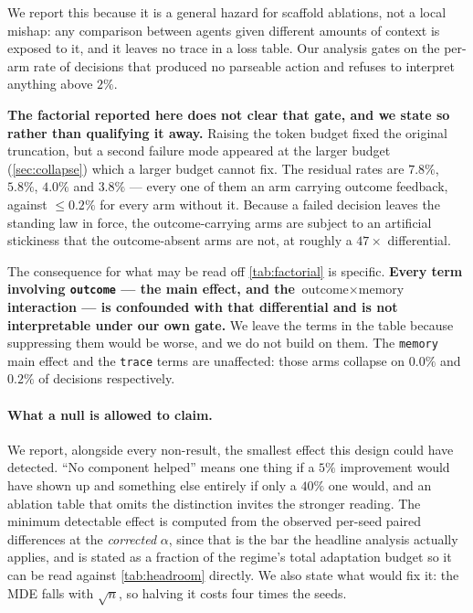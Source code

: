 \documentclass[11pt]{article}
\begin{document}
We report this because it is a general hazard for scaffold ablations, not a local mishap: any
comparison between agents given different amounts of context is exposed to it, and it leaves no trace
in a loss table. Our analysis gates on the per-arm rate of decisions that produced no parseable
action and refuses to interpret anything above $2\%$.

\textbf{The factorial reported here does not clear that gate, and we state so rather than qualifying
it away.} Raising the token budget fixed the original truncation, but a second failure mode appeared
at the larger budget (\cref{sec:collapse}) which a larger budget cannot fix. The residual rates are
$7.8\%$, $5.8\%$, $4.0\%$ and $3.8\%$ --- every one of them an arm carrying outcome feedback, against
$\leq 0.2\%$ for every arm without it. Because a failed decision leaves the standing law in force,
the outcome-carrying arms are subject to an artificial stickiness that the outcome-absent arms are
not, at roughly a $47\times$ differential.

The consequence for what may be read off \cref{tab:factorial} is specific. \textbf{Every term
involving \texttt{outcome} --- the main effect, and the $\text{outcome} \times \text{memory}$
interaction --- is confounded with that differential and is not interpretable under our own gate.} We
leave the terms in the table because suppressing them would be worse, and we do not build on them.
The \texttt{memory} main effect and the \texttt{trace} terms are unaffected: those arms collapse on
$0.0\%$ and $0.2\%$ of decisions respectively.

\paragraph{What a null is allowed to claim.} We report, alongside every non-result, the smallest
effect this design could have detected. ``No component helped'' means one thing if a $5\%$
improvement would have shown up and something else entirely if only a $40\%$ one would, and an
ablation table that omits the distinction invites the stronger reading. The minimum detectable
effect is computed from the observed per-seed paired differences at the \emph{corrected} $\alpha$,
since that is the bar the headline analysis actually applies, and is stated as a fraction of the
regime's total adaptation budget so it can be read against \cref{tab:headroom} directly. We also
state what would fix it: the MDE falls with $\sqrt{n}$, so halving it costs four times the seeds.
\end{document}
